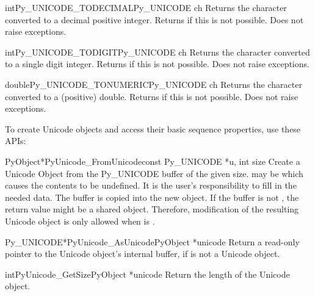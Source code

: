 \begin{cfuncdesc}{int}{Py_UNICODE_TODECIMAL}{Py_UNICODE ch}
  Returns the character  converted to a decimal positive
  integer.  Returns  if this is not possible.  Does not raise
  exceptions.
\end{cfuncdesc}

\begin{cfuncdesc}{int}{Py_UNICODE_TODIGIT}{Py_UNICODE ch}
  Returns the character  converted to a single digit integer.
  Returns  if this is not possible.  Does not raise
  exceptions.
\end{cfuncdesc}

\begin{cfuncdesc}{double}{Py_UNICODE_TONUMERIC}{Py_UNICODE ch}
  Returns the character  converted to a (positive) double.
  Returns  if this is not possible.  Does not raise
  exceptions.
\end{cfuncdesc}


To create Unicode objects and access their basic sequence properties,
use these APIs:

\begin{cfuncdesc}{PyObject*}{PyUnicode_FromUnicode}{const Py_UNICODE *u,
                                                    int size}
  Create a Unicode Object from the Py_UNICODE buffer  of the
  given size.  may be \NULL{} which causes the contents to be
  undefined. It is the user's responsibility to fill in the needed
  data.  The buffer is copied into the new object. If the buffer is
  not \NULL, the return value might be a shared object. Therefore,
  modification of the resulting Unicode object is only allowed when
   is \NULL.
\end{cfuncdesc}

\begin{cfuncdesc}{Py_UNICODE*}{PyUnicode_AsUnicode}{PyObject *unicode}
  Return a read-only pointer to the Unicode object's internal
   buffer, \NULL{} if  is not a Unicode
  object.
\end{cfuncdesc}

\begin{cfuncdesc}{int}{PyUnicode_GetSize}{PyObject *unicode}
  Return the length of the Unicode object.
\end{cfuncdesc}

